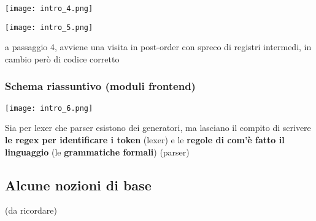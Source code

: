 \begin{example}[frametitle={Esempio: fasi applicate ad un'istruzione}]
  \noindent\begin{minipage}[c]{.4\textwidth}
    \texttt{[image: intro\_4.png]}
  \end{minipage}\vrule
  \begin{minipage}[c]{.2\textwidth}
    \texttt{[image: intro\_5.png]}
  \end{minipage}
  \begin{minipage}[b]{.4\textwidth}
  \begin{emphasize}
    a passaggio 4, avviene una visita in post-order con spreco di registri intermedi, in cambio per\`o di codice corretto
  \end{emphasize}
  \end{minipage}
  
\end{example}

\subsubsection{Schema riassuntivo (moduli frontend)}

\noindent\begin{minipage}[c]{.6\textwidth}
\texttt{[image: intro\_6.png]}
\end{minipage}
\begin{minipage}[c]{.4\textwidth}
  \begin{emphasize}
    Sia per lexer che parser esistono dei generatori, ma lasciano il compito di scrivere \textbf{le regex per identificare i token} (lexer) e le \textbf{regole di com'\`e fatto il linguaggio} (le \textbf{grammatiche formali}) (parser)
  \end{emphasize}
\end{minipage}

\subsection{Alcune nozioni di base}
(da ricordare)

